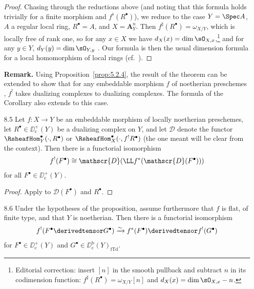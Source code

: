 \begin{proof}
Chasing through the reductions above (and noting that this formula holds trivially for a finite morphism and $f^{\flat}(R^{\bullet})$), we reduce to the case $Y=\Spec A$, $A$ a regular local ring, $R^\bullet=A$, and $X=\mathbf{A}_{Y}^{n}$. Then $f^{\sharp}(R^\bullet)=\omega_{X/Y}$, which is locally free of rank one, so for any $x\in X$ we have $d_X(x)=\dim\sO_{X,x}$,\footnote{Editorial correction: insert $[n]$ in the smooth pullback and subtract $n$ in its codimension function: $f^\sharp(R^\bullet)=\omega_{X/Y}[n]$ and $d_X(x)=\dim\sO_{X,x}-n$.} and for any $y\in Y$, $d_Y(y)=\dim\sO_{Y,y}$ \cite[\nopp \S4]{LC}. Our formula is then the usual dimension formula for a local homomorphism of local rings (cf.\ \cite[\nopp $0_{\mathrm{IV}}$,~17.3.3]{EGA}).
\end{proof}

\par\medskip\noindent\textbf{Remark.}
Using Proposition~\ref{prop:5.2.4}, the result of the theorem can be extended to show that for any embeddable morphism $f$ of noetherian preschemes , $f^{!}$ takes dualizing complexes to dualizing complexes. The formula of the Corollary also extends to this case.
\par\medskip

\begin{bookproposition}{8.5}\label{prop:5.8.5}
Let $f\colon X\to Y$ be an embeddable morphism of locally noetherian preschemes, let $R^\bullet\in\DD^+_{\mathrm{c}}(Y)$ be a dualizing complex on $Y$, and let $\mathscr{D}$ denote the functor $\RsheafHom^\bullet_{Y}(\cdot, R^\bullet)$ or $\RsheafHom^\bullet_{X}(\cdot, f^{!}R^\bullet)$ (the one meant will be clear from the context). Then there is a functorial isomorphism
\[
f^{!}(F^{\bullet}) \cong \mathscr{D}(\LL f^{*}(\mathscr{D}(F^{\bullet})))
\]
for all $F^\bullet\in\DD_{\mathrm{c}}^{+}(Y)$.
\end{bookproposition}

\begin{proof}
Apply  to $\mathscr{D}(F^\bullet)$ and $R^\bullet$.
\end{proof}

\begin{bookcorollary}{8.6}\label{cor:5.8.6}
Under the hypotheses of the proposition, assume furthermore that $f$ is flat, of finite type, and that $Y$ is noetherian. Then there is a functorial isomorphism
\[
f^{!}(F^{\bullet}\derivedtensor G^{\bullet}) \xrightarrow{\sim} f^{*}(F^{\bullet}) \derivedtensor f^{!}(G^{\bullet})
\]
for $F^\bullet\in\DD_{\mathrm{c}}^{+}(Y)$ and $G^\bullet\in\DD_{\mathrm{c}}^{\mathrm{b}}(Y)_{\mathrm{fTd}}$.
\end{bookcorollary}

